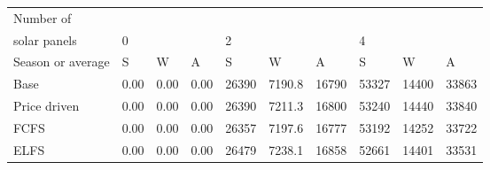 \begin{table}[h] 
\centering 
\begin{tabular}{l|lll|lll|lll}Number of \\ solar panels&0& & &2& & &4& & \\ \hline 
Season or average & S & W & A & S & W & A & S & W & A \\ \hline 
Base&0.00&0.00&0.00&26390&7190.8&16790&53327&14400&33863 \\ 
Price driven&0.00&0.00&0.00&26390&7211.3&16800&53240&14440&33840 \\ 
FCFS&0.00&0.00&0.00&26357&7197.6&16777&53192&14252&33722 \\ 
ELFS&0.00&0.00&0.00&26479&7238.1&16858&52661&14401&33531 \\ 
\end{tabular} 
\end{table}